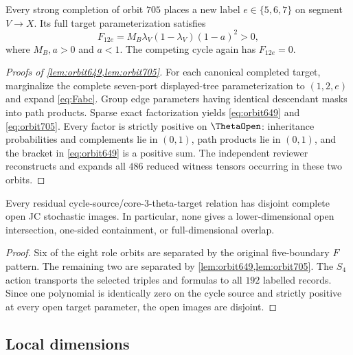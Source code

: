 \begin{lemma}\label{lem:orbit705}
Every strong completion of orbit $705$ places a new label $e\in\{5,6,7\}$ on segment $V\to X$.  Its full target parameterization satisfies
\begin{equation}\label{eq:orbit705}
F_{12e}=M_B\lambda_V(1-\lambda_V)(1-a)^2>0,
\end{equation}
where $M_B,a>0$ and $a<1$.  The competing cycle again has $F_{12e}=0$.
\end{lemma}

\begin{proof}[Proofs of \cref{lem:orbit649,lem:orbit705}]
For each canonical completed target, marginalize the complete seven-port displayed-tree parameterization to $(1,2,e)$ and expand \eqref{eq:Fabc}.  Group edge parameters having identical descendant masks into path products.  Sparse exact factorization yields \eqref{eq:orbit649} and \eqref{eq:orbit705}.  Every factor is strictly positive on $\ThetaOpen$: inheritance probabilities and complements lie in $(0,1)$, path products lie in $(0,1)$, and the bracket in \eqref{eq:orbit649} is a positive sum.  The independent reviewer reconstructs and expands all $486$ reduced witness tensors occurring in these two orbits.
\end{proof}

\begin{theorem}\label{thm:seven-separation}
Every residual cycle-source/core-3-theta-target relation has disjoint complete open JC stochastic images.  In particular, none gives a lower-dimensional open intersection, one-sided containment, or full-dimensional overlap.
\end{theorem}

\begin{proof}
Six of the eight role orbits are separated by the original five-boundary $F$ pattern.  The remaining two are separated by \cref{lem:orbit649,lem:orbit705}.  The $S_4$ action transports the selected triples and formulas to all $192$ labelled records.  Since one polynomial is identically zero on the cycle source and strictly positive at every open target parameter, the open images are disjoint.
\end{proof}

\subsection{Local dimensions}

